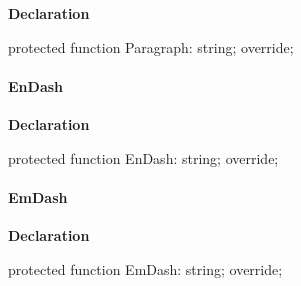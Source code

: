 \documentclass{report}
\newif\ifpdf
\begin{document}
\label{PasDoc_GenHtml.TGenericHTMLDocGenerator-Paragraph}
\begin{list}{}{
\setlength{\itemindent}{0cm}
\setlength{\listparindent}{0cm}
\setlength{\leftmargin}{\evensidemargin}
\addtolength{\leftmargin}{\tmplength}
\settowidth{\labelsep}{X}
\addtolength{\leftmargin}{\labelsep}
\setlength{\labelwidth}{\tmplength}
}
\item[\textbf{Declaration}\hfill]
\ifpdf
\begin{flushleft}
\fi
\begin{ttfamily}
protected function Paragraph: string; override;\end{ttfamily}

\ifpdf
\end{flushleft}
\fi

\end{list}
\paragraph*{EnDash}\hspace*{\fill}

\label{PasDoc_GenHtml.TGenericHTMLDocGenerator-EnDash}
\begin{list}{}{
\setlength{\itemindent}{0cm}
\setlength{\listparindent}{0cm}
\setlength{\leftmargin}{\evensidemargin}
\addtolength{\leftmargin}{\tmplength}
\settowidth{\labelsep}{X}
\addtolength{\leftmargin}{\labelsep}
\setlength{\labelwidth}{\tmplength}
}
\item[\textbf{Declaration}\hfill]
\ifpdf
\begin{flushleft}
\fi
\begin{ttfamily}
protected function EnDash: string; override;\end{ttfamily}

\ifpdf
\end{flushleft}
\fi

\end{list}
\paragraph*{EmDash}\hspace*{\fill}

\label{PasDoc_GenHtml.TGenericHTMLDocGenerator-EmDash}
\begin{list}{}{
\setlength{\itemindent}{0cm}
\setlength{\listparindent}{0cm}
\setlength{\leftmargin}{\evensidemargin}
\addtolength{\leftmargin}{\tmplength}
\settowidth{\labelsep}{X}
\addtolength{\leftmargin}{\labelsep}
\setlength{\labelwidth}{\tmplength}
}
\item[\textbf{Declaration}\hfill]
\ifpdf
\begin{flushleft}
\fi
\begin{ttfamily}
protected function EmDash: string; override;\end{ttfamily}

\ifpdf
\end{flushleft}
\fi

\end{list}
\end{document}
